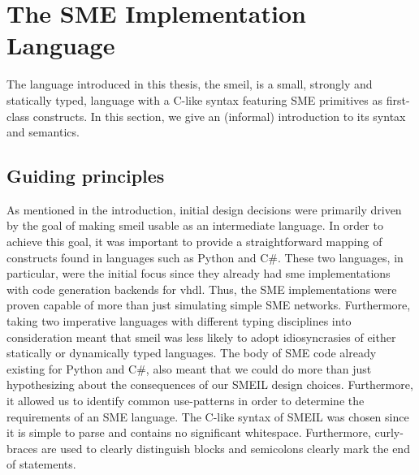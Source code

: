 \chapter{The SME Implementation Language}

The language introduced in this thesis, the \gls{smeil}, is a small, strongly
and statically typed, language with a C-like syntax featuring SME primitives as
first-class constructs.
In this section, we give an (informal) introduction to its syntax and semantics.


\section{Guiding principles}
As mentioned in the introduction, initial design decisions were primarily driven
by the goal of making \gls{smeil} usable as an intermediate language. In order
to achieve this goal, it was important to provide a straightforward mapping of
constructs found in languages such as Python and C\#. These two languages, in
particular, were the initial focus since they already had \gls{sme}
implementations with code generation backends for \gls{vhdl}. Thus, the SME
implementations were proven capable of more than just simulating simple SME
networks. Furthermore, taking two imperative languages with different typing
disciplines into consideration meant that \gls{smeil} was less likely to adopt
idiosyncrasies of either statically or dynamically typed languages. The body of
SME code already existing for Python and C\#, also meant that we could do more
than just hypothesizing about the consequences of our SMEIL design
choices. Furthermore, it allowed us to identify common use-patterns in order to
determine the requirements of an SME language. The C-like syntax of SMEIL was
chosen since it is simple to parse and contains no significant
whitespace. Furthermore, curly-braces are used to clearly distinguish blocks and
semicolons clearly mark the end of statements.

